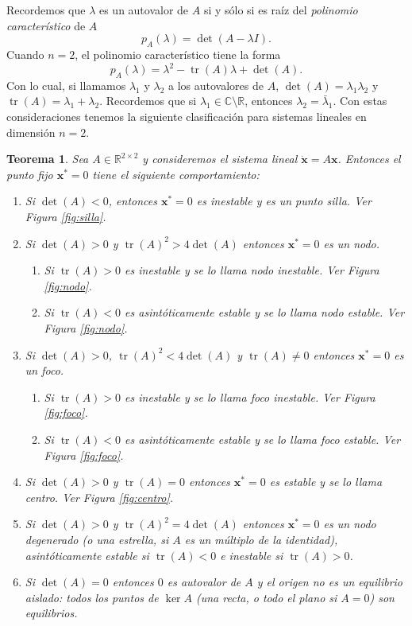 \documentclass[12pt, a4paper]{amsbook}
\newcommand{\tr}{\operatorname{tr}}
\newcommand{\R}{{\mathbb R}}
\newcommand{\C}{{\mathbb C}}
\newcommand{\xx}{{\mathbf x}}
\newtheorem{teo}{Teorema}[section]
\theoremstyle{remark}
\theoremstyle{definition}
\numberwithin{section}{chapter}
\numberwithin{subsection}{section}
\numberwithin{equation}{section}
\numberwithin{figure}{chapter}
\begin{document}
Recordemos que $\lambda$ es un autovalor de $A$ si y sólo si es raíz del {\em polinomio característico} de $A$
$$
p_A(\lambda) = \det(A-\lambda I).
$$
Cuando $n=2$, el polinomio característico tiene la forma
$$
p_A(\lambda) = \lambda^2 - \tr(A)\lambda + \det(A).
$$
Con lo cual, si llamamos $\lambda_1$ y $\lambda_2$ a los autovalores de $A$,  $\det(A) = \lambda_1\lambda_2$ y $\tr(A)=\lambda_1+\lambda_2$. Recordemos que si $\lambda_1\in\C\setminus\R$, entonces $\lambda_2=\bar \lambda_1$. Con estas consideraciones tenemos la siguiente clasificación para sistemas lineales en dimensión $n=2$.
\begin{teo}\label{teo.lineal}
Sea $A\in\R^{2\times 2}$ y consideremos el sistema lineal $\dot\xx = A\xx$. Entonces el punto fijo $\xx^*=0$ tiene el siguiente comportamiento:
\begin{enumerate}
\item Si $\det(A)<0$, entonces $\xx^*=0$ es inestable y es un {\em punto silla}. Ver Figura \ref{fig:silla}.

\item Si $\det(A)>0$ y $\tr(A)^2>4\det(A)$ entonces $\xx^*=0$ es un {\em nodo}. 
\begin{enumerate}
\item Si $\tr(A)>0$ es inestable y se lo llama {\em nodo inestable}. Ver Figura \ref{fig:nodo}.

\item Si $\tr(A)<0$ es asintóticamente estable y se lo llama {\em nodo estable}. Ver Figura \ref{fig:nodo}.
\end{enumerate}

\item Si $\det(A)>0$, $\tr(A)^2<4\det(A)$ y $\tr(A)\neq 0$ entonces $\xx^*=0$ es un {\em foco}.
\begin{enumerate}
\item Si $\tr(A)>0$ es inestable y se lo llama {\em foco inestable}. Ver Figura \ref{fig:foco}.

\item Si $\tr(A)<0$ es asintóticamente estable y se lo llama {\em foco estable}. Ver Figura \ref{fig:foco}.
\end{enumerate}

\item Si $\det(A)>0$ y $\tr(A)=0$ entonces $\xx^*=0$ es estable y se lo llama {\em centro}. Ver Figura \ref{fig:centro}.

\item Si $\det(A)>0$ y $\tr(A)^2=4\det(A)$ entonces $\xx^*=0$ es un {\em nodo degenerado} (o una {\em estrella}, si $A$ es un múltiplo de la identidad), asintóticamente estable si $\tr(A)<0$ e inestable si $\tr(A)>0$.

\item Si $\det(A)=0$ entonces $0$ es autovalor de $A$ y el origen no es un equilibrio aislado: todos los puntos de $\ker A$ (una recta, o todo el plano si $A=0$) son equilibrios.
\end{enumerate}
\end{teo}
\end{document}
